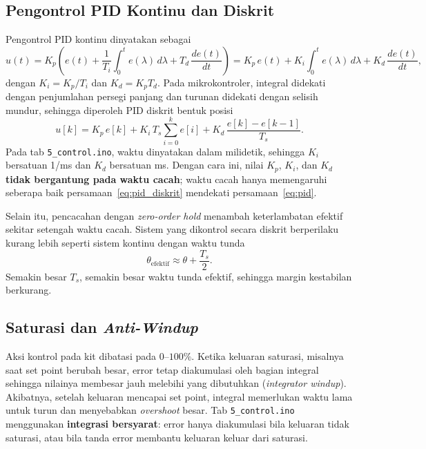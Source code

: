 \documentclass[11pt,a4paper]{article}
\newcommand{\prog}[1]{\texttt{#1}}
\begin{document}
\subsection{Pengontrol PID Kontinu dan Diskrit}
Pengontrol PID kontinu dinyatakan sebagai
\begin{equation}
u(t) = K_p\left(e(t) + \frac{1}{T_i}\int_0^t e(\lambda)\,d\lambda + T_d\,\frac{de(t)}{dt}\right)
= K_p\,e(t) + K_i\int_0^t e(\lambda)\,d\lambda + K_d\,\frac{de(t)}{dt},
\label{eq:pid}
\end{equation}
dengan $K_i = K_p/T_i$ dan $K_d = K_p T_d$. Pada mikrokontroler, integral didekati dengan penjumlahan persegi panjang dan turunan didekati dengan selisih mundur, sehingga diperoleh PID diskrit bentuk posisi
\begin{equation}
u[k] = K_p\,e[k] + K_i\,T_s\sum_{i=0}^{k} e[i] + K_d\,\frac{e[k] - e[k-1]}{T_s}.
\label{eq:pid_diskrit}
\end{equation}
Pada tab \prog{5\_control.ino}, waktu dinyatakan dalam milidetik, sehingga $K_i$ bersatuan 1/ms dan $K_d$ bersatuan ms. Dengan cara ini, nilai $K_p$, $K_i$, dan $K_d$ \textbf{tidak bergantung pada waktu cacah}; waktu cacah hanya memengaruhi seberapa baik persamaan~\eqref{eq:pid_diskrit} mendekati persamaan~\eqref{eq:pid}.

Selain itu, pencacahan dengan \textit{zero-order hold} menambah keterlambatan efektif sekitar setengah waktu cacah. Sistem yang dikontrol secara diskrit berperilaku kurang lebih seperti sistem kontinu dengan waktu tunda
\begin{equation}
\theta_{\text{efektif}} \approx \theta + \frac{T_s}{2}.
\label{eq:theta_efektif}
\end{equation}
Semakin besar $T_s$, semakin besar waktu tunda efektif, sehingga margin kestabilan berkurang.

\subsection{Saturasi dan \textit{Anti-Windup}}
Aksi kontrol pada kit dibatasi pada $0$--$100\%$. Ketika keluaran saturasi, misalnya saat set point berubah besar, error tetap diakumulasi oleh bagian integral sehingga nilainya membesar jauh melebihi yang dibutuhkan (\textit{integrator windup}). Akibatnya, setelah keluaran mencapai set point, integral memerlukan waktu lama untuk turun dan menyebabkan \textit{overshoot} besar. Tab \prog{5\_control.ino} menggunakan \textbf{integrasi bersyarat}: error hanya diakumulasi bila keluaran tidak saturasi, atau bila tanda error membantu keluaran keluar dari saturasi.
\end{document}
